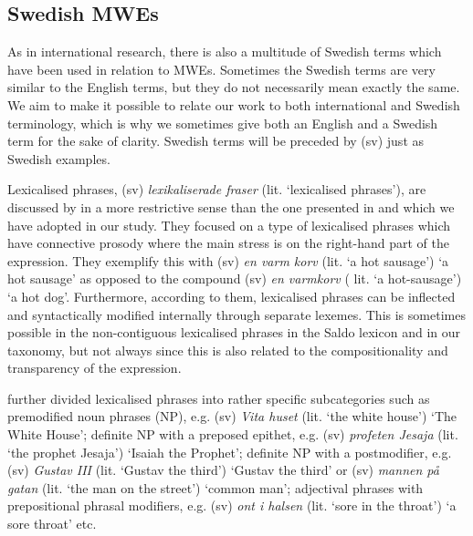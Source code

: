 \documentclass[output=paper,colorlinks,citecolor=brown]{langscibook}
\begin{document}
\subsection{Swedish MWEs}\label{sec:SweMWE}\largerpage[2]

As in international research, there is also a multitude of Swedish terms which have been used in relation to MWEs. Sometimes the Swedish terms are very similar to the English terms, but they do not necessarily mean exactly the same. We aim to make it possible to relate our work to both international and Swedish terminology, which is why we sometimes give both an English and a Swedish term for the sake of clarity. Swedish terms will be preceded by (sv) just as Swedish examples. 

Lexicalised phrases, (sv) \textit{lexikaliserade fraser} (lit. `lexicalised 
phrases’), are discussed by \citet{anward1976om} in a more restrictive sense than the one presented in \citet{Sag:Baldwin:2002} and which we have adopted in our study. They focused on a type of lexicalised phrases which have connective prosody where the main stress is on the right-hand part of the expression. They exemplify this with (sv) \textit{en varm korv} (lit. `a hot sausage') `a hot sausage' as opposed to the compound (sv) \textit{en varmkorv} (%
lit. `a hot-sausage') `a hot dog'. Furthermore, according to them, lexicalised phrases can be inflected and syntactically modified internally through separate lexemes. This is sometimes possible in the non-contiguous lexicalised phrases in the Saldo lexicon \citep{borin2013saldo} and in our taxonomy, but not always since this is also related to the compositionality and transparency of the expression.

\citet[][80–81]{anward1976om} further divided lexicalised phrases into rather specific subcategories such as premodified noun phrases (NP), e.g. (sv) \textit{Vita huset}
(lit. `the white house') 
`The White House'; definite NP with a preposed epithet, e.g. (sv) \textit{profeten Jesaja} 
(lit. `the prophet Jesaja') 
`Isaiah the Prophet'; definite NP with a postmodifier, e.g. (sv) \textit{Gustav III} 
(lit. `Gustav the third') 
`Gustav the third' or (sv) \textit{mannen på gatan}
(lit. `the man on the street') `common man'; adjectival phrases with prepositional phrasal modifiers, e.g. (sv) \textit{ont i halsen} 
(lit. `sore in the throat') `a sore throat' etc.
\end{document}
